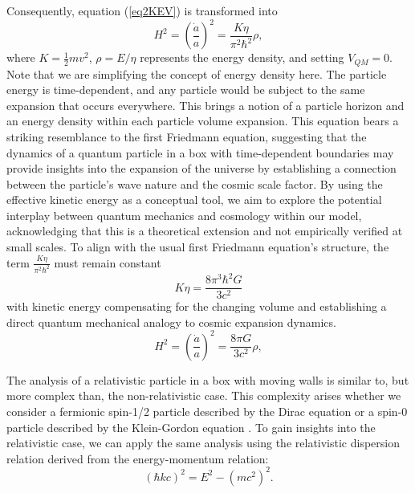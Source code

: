 \documentclass[sn-mathphys-num]{sn-jnl}%
\begin{document}
Consequently, equation (\ref{eq2KEV}) is transformed into
\begin{equation}
H^2 = \left( \frac{\dot{a}}{a} \right)^2 = \frac{K\eta}{\pi^2 \hbar^2} \rho, \label{eq:Friedmann1fromQuantum}
\end{equation}
where $K=\frac{1}{2}mv^{2}$, $\rho=E/\eta$ represents the energy density, and setting $V_{QM}=0$. Note that we are simplifying the concept of energy density here. The particle energy is time-dependent, and any particle would be subject to the same expansion that occurs everywhere. This brings a notion of a particle horizon and an energy density within each particle volume expansion. This equation bears a striking resemblance to the first Friedmann equation, suggesting that the dynamics of a quantum particle in a box with time-dependent boundaries may provide insights into the expansion of the universe by establishing a connection between the particle's wave nature and the cosmic scale factor. By using the effective kinetic energy as a conceptual tool, we aim to explore the potential interplay between quantum mechanics and cosmology within our model, acknowledging that this is a theoretical extension and not empirically verified at small scales.
To align with the usual first Friedmann equation's structure, the term $\frac{K\eta}{\pi^2 \hbar^2}$ must remain constant
\begin{equation}
K\eta=\frac{8\pi^{3}\hbar^{2}G}{3c^{2}} \label{kineticvolumeconstar}
\end{equation}
with kinetic energy compensating for the changing volume and establishing a direct quantum mechanical analogy to cosmic expansion dynamics.
\begin{equation}
H^2 = \left( \frac{\dot{a}}{a} \right)^2 = \frac{8\pi G}{3c^{2}} \rho, \label{eq:Friedmann1fromQuantum2}
\end{equation}


The analysis of a relativistic particle in a box with moving walls is similar to, but more complex than, the non-relativistic case. This complexity arises whether we consider a fermionic spin-1/2 particle described by the Dirac equation or a spin-0 particle described by the Klein-Gordon equation \cite{Koehn:2012red}. To gain insights into the relativistic case, we can apply the same analysis using the relativistic dispersion relation derived from the energy-momentum relation:
\begin{equation}
(\hbar kc)^2  = E^2 - (mc^2)^2. \label{eqRelDispersion}
\end{equation}
\end{document}
